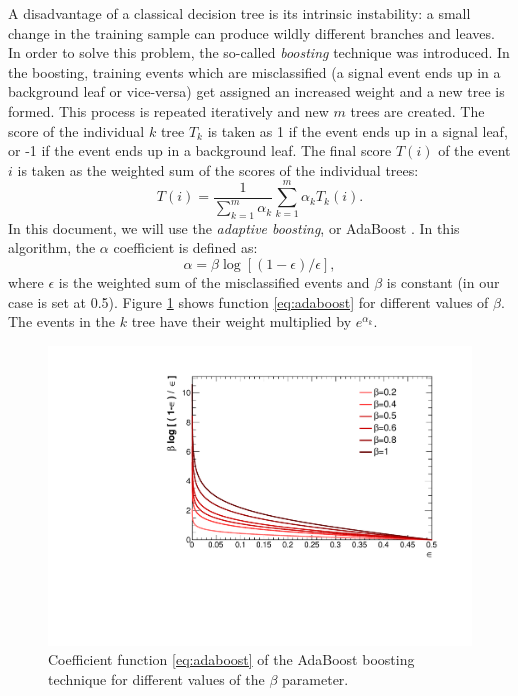 A disadvantage of a classical decision tree is its intrinsic instability: a small change in the training sample can produce wildly different branches and leaves. In order to solve this problem, the so-called \emph{boosting} technique was introduced. In the boosting, training events which are misclassified (a signal event ends up in a background leaf or vice-versa) get assigned an increased weight and a new tree is formed. This process is repeated iteratively and new $m$ trees are created. The score of the individual $k$ tree $T_k$ is taken as 1 if the event ends up in a signal leaf, or -1 if the event ends up in a background leaf.  The final score $T(i)$ of the event $i$ is taken as the weighted sum of the scores of the individual trees:
\begin{equation}
    T(i) = \frac{1}{\sum^m_{k=1} \alpha_k} \sum^m_{k=1}\alpha_k T_k(i).
\end{equation}
In this document, we will use the \emph{adaptive boosting}, or AdaBoost \cite{freund1999short}. In this algorithm, the $\alpha$ coefficient is defined as:
\begin{equation}
    \alpha = \beta \log[(1-\epsilon)/\epsilon],\label{eq:adaboost}
\end{equation}
where $\epsilon$ is the weighted sum of the misclassified events and $\beta$ is constant (in our case is set at 0.5). Figure \ref{fig:adaboost} shows function \eqref{eq:adaboost} for different values of $\beta$. The events in the $k$ tree have their weight multiplied by $e^{\alpha_k}$.

\begin{figure}[htbp]
\centering
  \includegraphics[width=0.75\linewidth]{figures/adaboost.pdf}
  \caption{Coefficient function \eqref{eq:adaboost} of the AdaBoost boosting technique for different values of the $\beta$ parameter.}
  \label{fig:adaboost}
\end{figure}

